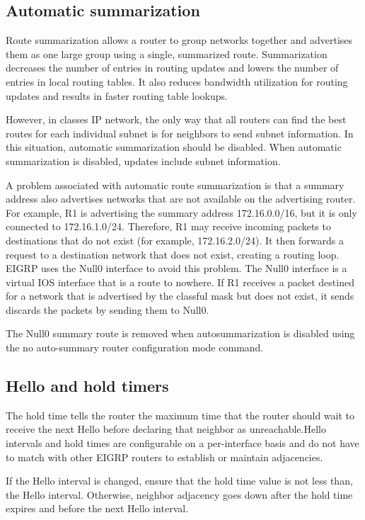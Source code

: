 \subsection{Automatic summarization}
Route summarization allows a router to group networks together and advertises them as one large group using a single, summarized route. Summarization decreases the number of entries in routing updates and lowers the number of entries in local routing tables. It also reduces bandwidth utilization for routing updates and results in faster routing table lookups.\par 
However, in classes IP network, the only way that all routers can find the best routes for each individual subnet is for neighbors to send subnet information. In this situation, automatic summarization should be disabled. When automatic summarization is disabled, updates include subnet information.\par 
A problem associated with automatic route summarization is that a summary address also advertises networks that are not available on the advertising router. For example, R1 is advertising the summary address 172.16.0.0/16, but it is only connected to 172.16.1.0/24. Therefore, R1 may receive incoming packets to destinations that do not exist (for example, 172.16.2.0/24). It then forwards a request to a destination network that does not exist, creating a routing loop.\\
EIGRP uses the Null0 interface to avoid this problem. The Null0 interface is a virtual IOS interface that is a route to nowhere. If R1 receives a packet destined for a network that is advertised by the classful mask but does not exist, it sends discards the packets by sending them to Null0.\par 
\note  The Null0 summary route is removed when autosummarization is disabled using the no auto-summary router configuration mode command.
\subsection{Hello and hold timers}
 The hold time tells the router the maximum time that the router should wait to receive the next Hello before declaring that neighbor as unreachable.Hello intervals and hold times are configurable on a per-interface basis and do not have to match with other EIGRP routers to establish or maintain adjacencies.\par 
If the Hello interval is changed, ensure that the hold time value is not less than, the Hello interval. Otherwise, neighbor adjacency goes down after the hold time expires and before the next Hello interval. 